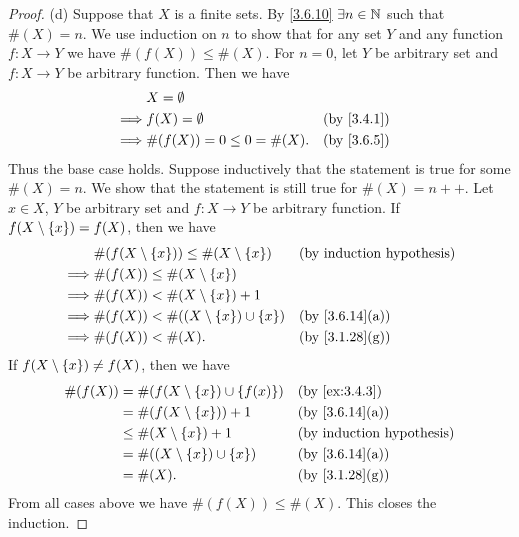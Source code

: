 \begin{proof}{(d)}
  Suppose that \(X\) is a finite sets.
  By \cref{3.6.10} \(\exists n \in \mathbb{N}\) such that \(\#(X) = n\).
  We use induction on \(n\) to show that for any set \(Y\) and any function \(f : X \to Y\) we have \(\#(f(X)) \leq \#(X)\).
  For \(n = 0\), let \(Y\) be arbitrary set and \(f : X \to Y\) be arbitrary function.
  Then we have
  \begin{align*}
             & X = \emptyset                                \\
    \implies & f(X) = \emptyset             &  & \by{3.4.1} \\
    \implies & \#(f(X)) = 0 \leq 0 = \#(X). &  & \by{3.6.5}
  \end{align*}
  Thus the base case holds.
  Suppose inductively that the statement is true for some \(\#(X) = n\).
  We show that the statement is still true for \(\#(X) = n++\).
  Let \(x \in X\), \(Y\) be arbitrary set and \(f : X \to Y\) be arbitrary function.
  If \(f(X \setminus \left\lbrace x\right\rbrace) = f(X)\), then we have
  \begin{align*}
             & \#(f(X \setminus \set{x})) \leq \#(X \setminus \set{x}) &  & \byIH                        \\
    \implies & \#(f(X)) \leq \#(X \setminus \set{x})                                                     \\
    \implies & \#(f(X)) < \#(X \setminus \set{x}) + 1                                                    \\
    \implies & \#(f(X)) < \#((X \setminus \set{x}) \cup \set{x})       &  & \text{(by \cref{3.6.14}(a))} \\
    \implies & \#(f(X)) < \#(X).                                       &  & \text{(by \cref{3.1.28}(g))}
  \end{align*}
  If \(f(X \setminus \left\lbrace x\right\rbrace) \neq f(X)\), then we have
  \begin{align*}
    \#(f(X)) & = \#(f(X \setminus \set{x}) \cup \set{f(x)}) &  & \by{ex:3.4.3}                \\
             & = \#(f(X \setminus \set{x})) + 1             &  & \text{(by \cref{3.6.14}(a))} \\
             & \leq \#(X \setminus \set{x}) + 1             &  & \byIH                        \\
             & = \#((X \setminus \set{x}) \cup \set{x})     &  & \text{(by \cref{3.6.14}(a))} \\
             & = \#(X).                                     &  & \text{(by \cref{3.1.28}(g))}
  \end{align*}
  From all cases above we have \(\#(f(X)) \leq \#(X)\).
  This closes the induction.


\end{proof}
